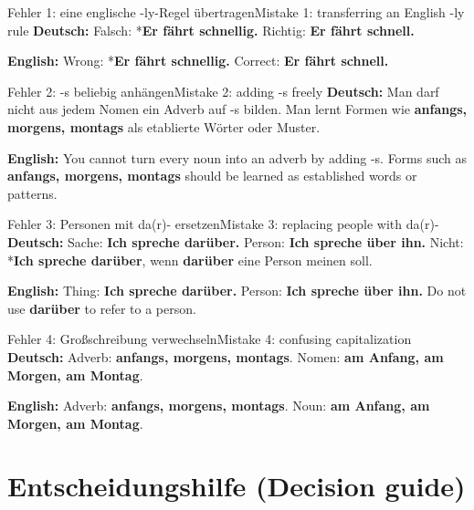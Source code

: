 \documentclass[a4paper,11pt]{article}
\newcommand{\GermanText}[1]{\textbf{Deutsch: }#1\par}
\newcommand{\EnglishText}[1]{{\small\color{SoftGray}\textbf{English: }#1\par}}
\newcommand{\BSection}[2]{\section{#1 \textnormal{\small (#2)}}}
\begin{document}
\begin{grammarentry}{Fehler 1: eine englische -ly-Regel übertragen}{Mistake 1: transferring an English -ly rule}
\GermanText{Falsch: *\textbf{Er fährt schnellig.} Richtig: \textbf{Er fährt schnell.}}
\EnglishText{Wrong: *\textbf{Er fährt schnellig.} Correct: \textbf{Er fährt schnell.}}
\end{grammarentry}

\begin{grammarentry}{Fehler 2: -s beliebig anhängen}{Mistake 2: adding -s freely}
\GermanText{Man darf nicht aus jedem Nomen ein Adverb auf -s bilden. Man lernt Formen wie \textbf{anfangs, morgens, montags} als etablierte Wörter oder Muster.}
\EnglishText{You cannot turn every noun into an adverb by adding -s. Forms such as \textbf{anfangs, morgens, montags} should be learned as established words or patterns.}
\end{grammarentry}

\begin{grammarentry}{Fehler 3: Personen mit da(r)- ersetzen}{Mistake 3: replacing people with da(r)-}
\GermanText{Sache: \textbf{Ich spreche darüber.} Person: \textbf{Ich spreche über ihn.} Nicht: *\textbf{Ich spreche darüber}, wenn \textbf{darüber} eine Person meinen soll.}
\EnglishText{Thing: \textbf{Ich spreche darüber.} Person: \textbf{Ich spreche über ihn.} Do not use \textbf{darüber} to refer to a person.}
\end{grammarentry}

\begin{grammarentry}{Fehler 4: Großschreibung verwechseln}{Mistake 4: confusing capitalization}
\GermanText{Adverb: \textbf{anfangs, morgens, montags}. Nomen: \textbf{am Anfang, am Morgen, am Montag}.}
\EnglishText{Adverb: \textbf{anfangs, morgens, montags}. Noun: \textbf{am Anfang, am Morgen, am Montag}.}
\end{grammarentry}

\BSection{Entscheidungshilfe}{Decision guide}
\end{document}
